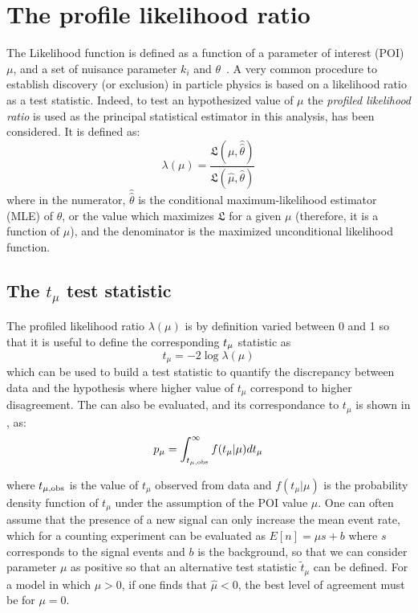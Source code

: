 \section{The profile likelihood ratio}
The Likelihood function is defined as a function of a parameter of interest (POI) $\mu$, and a set of nuisance parameter $k_i$ and $\theta$~\cite{Cowan}.
A very common procedure to establish discovery (or exclusion) in particle physics is based on a likelihood ratio as a test statistic. Indeed, to test an hypothesized value of $\mu$ the \emph{profiled likelihood ratio} is used as the principal statistical estimator in this analysis, has been considered. It is defined as:
\begin{equation}
  \lambda(\mu) = \frac {\mathfrak{L}(\mu,\hat{\hat{\theta}})}{\mathfrak{L(\hat{\mu},\hat{\theta})}}
  \label{eqn:profiled}
\end{equation}
where in the numerator, $\hat{\hat{\theta}}$ is the conditional maximum-likelihood estimator (MLE) of $\theta$, or the value which maximizes $\mathfrak{L}$ for a given $\mu$ (therefore, it is a function of $\mu$), and the denominator is the maximized unconditional likelihood function.

\subsection{The $t_\mu$ test statistic}
The profiled likelihood ratio $\lambda(\mu)$ is by definition varied between 0 and 1 so that it is useful to define the corresponding $t_{\mu}$ statistic as 
\begin{equation}
  t_{\mu} = -2 \log{\lambda(\mu)}
\end{equation}
which can be used to build a test statistic to quantify the discrepancy between data and the hypothesis where higher value of $t_{\mu}$ correspond to higher disagreement. The \p can also be evaluated, and its correspondance to $t_{\mu}$ is shown in \Fig{\ref{pvalue}}, as:
\begin{equation}
 p_{\mu}=\int_{t_{\mu,\textup{obs}}}^\infty f(t_\mu \vert \mu) dt_\mu
 \label{eqn:pdatmu}
\end{equation}

where $t_{\mu,\textup{obs}}$ is the value of $t_\mu$ observed from data and $f(t_\mu \vert \mu)$ is the probability density function of $t_\mu$ under the assumption of the POI value $\mu$. One can often assume that the presence of a new signal can only increase the mean event rate, which for a counting experiment can be evaluated as $E[n] = \mu s + b$ where $s$ corresponds to the signal events and $b$ is the background, so that we can consider parameter $\mu$ as positive so that an alternative test statistic $\tilde{t}_\mu$ can be defined. For a model in which $\mu>0$, if one finds that $\hat{\mu}<0$, the best level of agreement must be for $\mu=0$.

